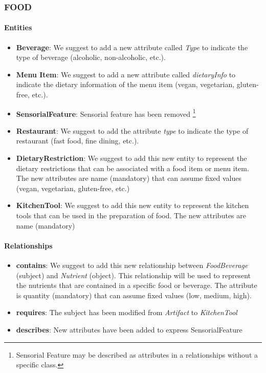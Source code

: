 \subsubsection{FOOD}
\paragraph{Entities}
\begin{itemize}
    \item \textbf{Beverage}: We suggest to add a new attribute called \textit{Type} to indicate the type of beverage (alcoholic, non-alcoholic, etc.).
    \item \textbf{Menu Item}: We suggest to add a new attribute called \textit{dietaryInfo} to indicate the dietary information of the menu item (vegan, vegetarian, gluten-free, etc.).
    \item \textbf{SensorialFeature}: Sensorial feature has been removed \footnote{Sensorial Feature may be described as attributes in a relationships without a specific class.}
    \item \textbf{Restaurant}: We suggest to add the attribute \textit{type} to indicate the type of restaurant (fast food, fine dining, etc.).
    \item \textbf{DietaryRestriction}: We suggest to add this new entity to represent the dietary restrictions that can be associated with a food item or menu item. The new attributes are name (mandatory) that can assume fixed values (vegan, vegetarian, gluten-free, etc.) 
    \item \textbf{KitchenTool}: We suggest to add this new entity to represent the kitchen tools that can be used in the preparation of food. The new attributes are name (mandatory)
\end{itemize}

\paragraph{Relationships}
\begin{itemize}
    \item \textbf{contains}: We suggest to add this new relationship between \textit{FoodBeverage} (subject) and \textit{Nutrient} (object). This relationship will be used to represent the nutrients that are contained in a specific food or beverage. The attribute is quantity (mandatory) that can assume fixed values (low, medium, high).
    \item \textbf{requires}: The subject has been modified from \textit{Artifact} to \textit{KitchenTool}
    \item \textbf{describes}: New attributes have been added to express SensorialFeature 
\end{itemize}

